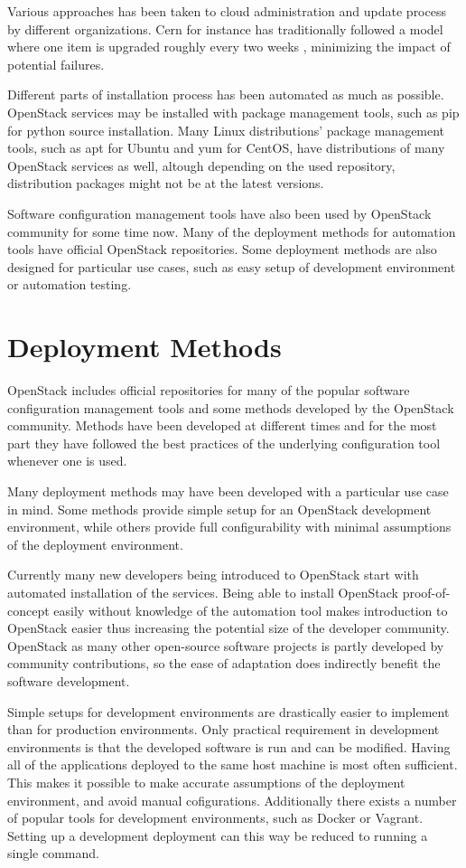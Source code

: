 Various approaches has been taken to cloud administration and update process by
different organizations. Cern for instance has traditionally followed a model
where one item is upgraded roughly every two weeks \cite{cern}, minimizing the
impact of potential failures.

Different parts of installation process has been automated as much as possible.
OpenStack services may be installed with package management tools, such as pip
for python source installation. Many Linux distributions' package management
tools, such as apt for Ubuntu and yum for CentOS, have distributions of many
OpenStack services as well, altough depending on the used repository,
distribution packages might not be at the latest versions.

Software configuration management tools have also been used by OpenStack
community for some time now. Many of the deployment methods for automation
tools have official OpenStack repositories. Some deployment methods are also
designed for particular use cases, such as easy setup of development
environment or automation testing.

\section{Deployment Methods}

OpenStack includes official repositories for many of the popular software
configuration management tools and some methods developed by the OpenStack
community. Methods have been developed at different times and for the most part
they have followed the best practices of the underlying configuration tool
whenever one is used.

Many deployment methods may have been developed with a particular use case in
mind. Some methods provide simple setup for an OpenStack development
environment, while others provide full configurability with minimal assumptions
of the deployment environment.

Currently many new developers being introduced to OpenStack start with
automated installation of the services. Being able to install OpenStack
proof-of-concept easily without knowledge of the automation tool makes
introduction to OpenStack easier thus increasing the potential size of the
developer community. OpenStack as many other open-source software projects is
partly developed by community contributions, so the ease of adaptation does
indirectly benefit the software development.

Simple setups for development environments are drastically easier to implement
than for production environments. Only practical requirement in development
environments is that the developed software is run and can be modified. Having
all of the applications deployed to the same host machine is most often
sufficient. This makes it possible to make accurate assumptions of the
deployment environment, and avoid manual cofigurations. Additionally there
exists a number of popular tools for development environments, such as Docker
or Vagrant. Setting up a development deployment can this way be reduced to
running a single command.


